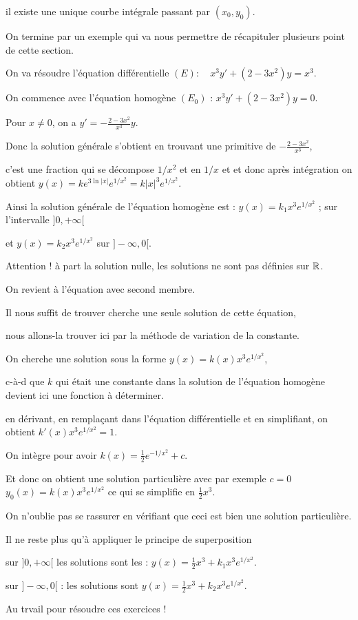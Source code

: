 \change
il existe une unique 
courbe intégrale passant par $(x_0,y_0)$.


\diapo

On termine par un exemple qui va nous permettre de récapituler plusieurs
point de cette section.

On va résoudre l'équation différentielle 
$(E) : \quad x^3y'+(2-3x^2)y=x^3$. 


\change
On commence avec l'équation homogène $(E_0)$ :
$x^3y'+(2-3x^2)y=0$.  

\change
Pour $x\neq 0$, on a $y'=-\frac{2-3x^2}{x^3}y$. 

\change
Donc la solution générale s'obtient en trouvant une primitive
de $-\frac{2-3x^2}{x^3}$,

\change
c'est une fraction qui se décompose $1/x^2$ et en $1/x$ et 
et donc après intégration on obtient 
$y(x) =k e^{3\ln |x|}e^{1/x^2}=k|x|^3e^{1/x^2}$. 

\change
Ainsi la solution générale de l'équation homogène 
est  : $y(x)= k_1 x^3e^{1/x^2}$ ; sur l'intervalle $]0,+\infty[$

\change 
et $y(x)= k_2 x^3e^{1/x^2}$ sur $]-\infty,0[$.

Attention ! à part la solution nulle, 
les solutions ne sont pas définies sur $\mathbb{R}$.


\change
On revient à l'équation avec second membre.

Il nous suffit de trouver cherche une seule solution de cette équation,

nous allons-la trouver ici par la méthode de variation de la constante.  

\change
On cherche une solution sous la forme $y(x)=k(x)x^3e^{1/x^2}$, 

c-à-d que $k$ qui était une constante dans la solution de l'équation homogène
devient ici une fonction à déterminer.

\change
en dérivant,
en remplaçant dans l'équation différentielle
et en simplifiant, on obtient 
$k'(x) x^3e^{1/x^2} =1. $ 

\change
On intègre pour avoir $k(x)=\frac{1}{2}e^{-1/x^2}+c$. 

\change
Et donc on obtient une solution 
particulière avec par exemple $c=0$
$y_0(x)=k(x)x^3e^{1/x^2}$ ce qui se simplifie en $\frac{1}{2}x^3$. 

On n'oublie pas se rassurer en vérifiant que ceci est bien une solution particulière.

\change
Il ne reste plus qu'à appliquer le principe de superposition 

\change

\change
    
sur $]0,+\infty[$  les solutions sont les : $y(x)=\frac{1}{2}x^3+k_1x^3e^{1/x^2}$.   

sur $]-\infty,0[$ : les solutions sont $y(x)=\frac{1}{2}x^3+k_2x^3e^{1/x^2}$.  

\diapo

Au trvail pour résoudre ces exercices !




